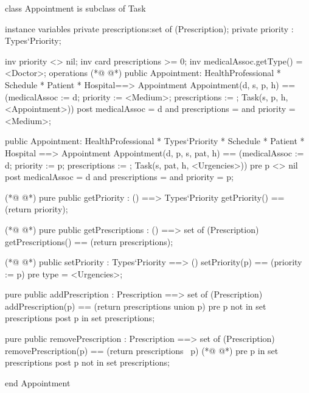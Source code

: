 \begin{vdmpp}[breaklines=true]
class Appointment is subclass of Task

instance variables
  private prescriptions:set of (Prescription);
  private priority : Types`Priority;
  
  inv priority <> nil;
  inv card prescriptions >= 0;
  inv medicalAssoc.getType() = <Doctor>;
operations
(*@
\label{Appointment:11}
@*)
 public Appointment: HealthProfessional * Schedule * Patient * Hospital==> Appointment
  Appointment(d, s, p, h) == (medicalAssoc := d; priority := <Medium>; prescriptions := {}; Task(s, p, h, <Appointment>))
 post medicalAssoc = d and prescriptions = {} and priority = <Medium>;
 
 public Appointment: HealthProfessional * Types`Priority * Schedule * Patient * Hospital ==> Appointment
  Appointment(d, p, s, pat, h) == (medicalAssoc := d; priority := p; prescriptions := {}; Task(s, pat, h, <Urgencies>))
 pre p <> nil
 post medicalAssoc = d and prescriptions = {} and priority = p;

(*@
\label{getPriority:20}
@*)
 pure public getPriority : () ==> Types`Priority
  getPriority() == (return priority);
 
(*@
\label{getPrescriptions:23}
@*)
  pure public getPrescriptions : () ==> set of (Prescription)
   getPrescriptions() == (return prescriptions);
  
(*@
\label{getPrescription:26}
@*)
  public setPriority : Types`Priority ==> ()
   setPriority(p) == (priority := p)
  pre type = <Urgencies>;
  
  pure public addPrescription : Prescription ==> set of (Prescription)
   addPrescription(p) == (return prescriptions union {p})
  pre p not in set prescriptions
  post p in set prescriptions;
                 
 pure public removePrescription : Prescription ==> set of (Prescription)
   removePrescription(p) == (return prescriptions \ {p})
(*@
\label{setPriority:37}
@*)
  pre p in set prescriptions
  post p not in set prescriptions;
   
end Appointment
\end{vdmpp}

